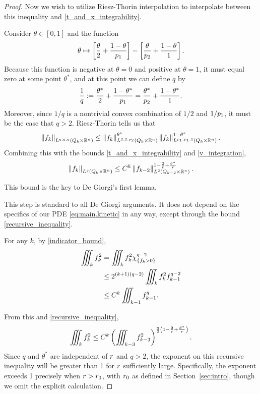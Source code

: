 \begin{proof}
Now we wish to utilize Riesz-Thorin interpolation to interpolate between this inequality and \eqref{t_and_x_integrability}.  

Consider $\theta \in [0,1]$ and the function
\[ \theta \mapsto \left[ \frac{\theta}{2} + \frac{1-\theta}{{p_1}} \right] - \left[ \frac{\theta}{{p_2}} + \frac{1-\theta}{1} \right]. \]
Because this function is negative at $\theta=0$ and positive at $\theta=1$, it must equal zero at some point $\theta^*$, and at this point we can define $q$ by
\[ \frac{1}{q} := \frac{\theta^*}{2} + \frac{1-\theta^*}{{p_1}} = \frac{\theta^*}{{p_2}} + \frac{1-\theta^*}{1}. \]
Moreover, since $1/q$ is a nontrivial convex combination of $1/2$ and $1/{p_1}$, it must be the case that $q > 2$.  Riesz-Thorin tells us that
\[ \left\lVert f_k\right\rVert_{L^{q,q,q}(Q_k \times \mathbb{R}^n)} \leq \left\lVert f_k\right\rVert_{L^{2,2,{p_2}}(Q_k \times \mathbb{R}^n)}^{\theta^\ast} \left\lVert f_k\right\rVert_{L^{{p_1},{p_1},1}(Q_k \times \mathbb{R}^n)}^{1-\theta^\ast}. \]
Combining this with the bounds \eqref{t_and_x_integrability} and \eqref{v_integration},
\begin{equation}\label{recursive_inequality}
\left\lVert f_k\right\rVert_{L^q(Q_k\times \mathbb{R}^n)} \leq C^k \left\lVert f_{k-2}\right\rVert_{L^2(Q_{k-2}\times \mathbb{R}^n)}^{1-\frac{2}{{r}} + \frac{\theta^\ast}{{r}}}.
\end{equation}

This bound is the key to De Giorgi's first lemma.  



This step is standard to all De Giorgi arguments.  It does not depend on the specifics of our PDE \eqref{eq:main.kinetic} in any way, except through the bound \eqref{recursive_inequality}.  

For any $k$, by \eqref{indicator_bound},
\begin{align*}
\iiint_k f_k^2 &= \iiint_k f_k^2 \chi_{\{f_k>0\}}^{q-2}
\\ &\leq 2^{(k+1)(q-2)} \iiint_{k} f_{k}^2 f_{k-1}^{q-2}
\\ &\leq C^k \iiint_{k-1} f_{k-1}^q.
\end{align*}

From this and \eqref{recursive_inequality},
\[ \iiint_k f_k^2 \leq C^k \left( \iiint_{k-3} f_{k-3}^2 \right)^{\frac{q}{2}\left( 1 - \frac{2}{{r}} + \frac{\theta^\ast}{{r}} \right)}. \]
Since $q$ and $\theta^\ast$ are independent of ${r}$ and $q > 2$, the exponent on this recursive inequality will be greater than 1 for ${r}$ sufficiently large.  Specifically, the exponent exceeds 1 precisely when ${r} > {r}_0$, with ${r}_0$ as defined in Section~\ref{sec:intro}, though we omit the explicit calculation.  


\end{proof}
